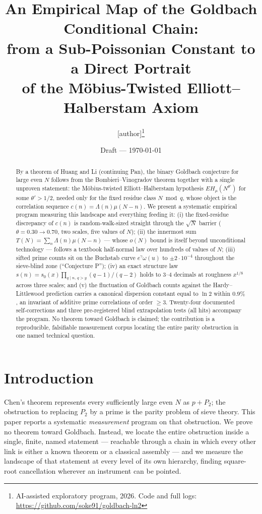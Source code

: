\documentclass[11pt]{article}
\title{An Empirical Map of the Goldbach Conditional Chain:\\
from a Sub-Poissonian Constant to a Direct Portrait\\
of the M\"obius-Twisted Elliott--Halberstam Axiom}
\author{[author]\thanks{AI-assisted exploratory program, 2026.
Code and full logs: \url{https://github.com/soke91/goldbach-ln2}}}
\date{Draft — \today}
\theoremstyle{definition}
\begin{document}
\maketitle

\begin{abstract}
By a theorem of Huang and Li (continuing Pan), the binary Goldbach
conjecture for large even $N$ follows from the Bombieri--Vinogradov
theorem together with a single unproven statement: the M\"obius-twisted
Elliott--Halberstam hypothesis $EH_\mu(N^{\theta'})$ for some
$\theta' > 1/2$, needed only for the fixed residue class $N \bmod q$,
whose object is the correlation sequence $c(n) = \Lambda(n)\mu(N-n)$.
We present a systematic empirical program measuring this landscape and
everything feeding it: (i) the fixed-residue discrepancy of $c(n)$ is
random-walk-sized straight through the $\sqrt N$ barrier
($\theta = 0.30 \to 0.70$, two scales, five values of $N$);
(ii) the innermost sum $T(N) = \sum_n \Lambda(n)\mu(N-n)$ --- whose
$o(N)$ bound is itself beyond unconditional technology --- follows a
textbook half-normal law over hundreds of values of $N$; (iii) sifted
prime counts sit on the Buchstab curve $e^\gamma\omega(u)$ to
$\pm 2\cdot 10^{-4}$ throughout the sieve-blind zone (``Conjecture P'');
(iv) an exact structure law
$s(n) = s_0(x)\prod_{q \mid n,\, q > y}(q-1)/(q-2)$ holds to 3--4
decimals at roughness $x^{1/8}$ across three scales; and (v) the
fluctuation of Goldbach counts against the Hardy--Littlewood prediction
carries a canonical dispersion constant equal to $\ln 2$ within
$0.9\%$, an invariant of additive prime correlations of order $\ge 3$.
Twenty-four documented self-corrections and three pre-registered blind
extrapolation tests (all hits) accompany the program. No theorem toward
Goldbach is claimed; the contribution is a reproducible, falsifiable
measurement corpus locating the entire parity obstruction in one named
technical question.
\end{abstract}

\section{Introduction}

Chen's theorem represents every sufficiently large even $N$ as $p + P_2$;
the obstruction to replacing $P_2$ by a prime is the parity problem of
sieve theory. This paper reports a systematic \emph{measurement} program
on that obstruction. We prove no theorem toward Goldbach. Instead, we
locate the entire obstruction inside a single, finite, named statement
--- reachable through a chain in which every other link is either a
known theorem or a classical assembly --- and we measure the landscape
of that statement at every level of its own hierarchy, finding
square-root cancellation wherever an instrument can be pointed.
\end{document}
